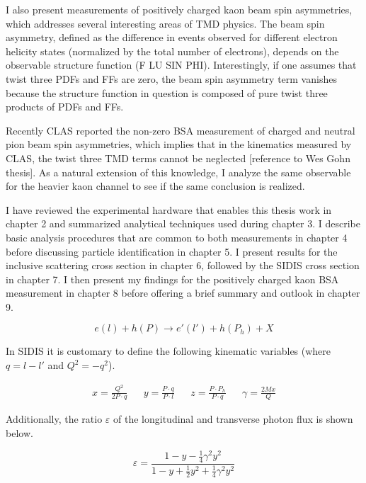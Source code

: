 I also present measurements of positively charged kaon beam spin asymmetries, which addresses several interesting areas of TMD physics.  The beam spin asymmetry, defined as the difference in events observed for different electron helicity states (normalized by the total number of electrons), depends on the observable structure function (F LU SIN PHI).  Interestingly, if one assumes that twist three PDFs and FFs are zero, the beam spin asymmetry term vanishes because the structure function in question is composed of pure twist three products of PDFs and FFs.

Recently CLAS reported the non-zero BSA measurement of charged and neutral pion beam spin asymmetries, which implies that in the kinematics measured by CLAS, the twist three TMD terms cannot be neglected [reference to Wes Gohn thesis].  As a natural extension of this knowledge, I analyze the same observable for the heavier kaon channel to see if the same conclusion is realized.

I have reviewed the experimental hardware that enables this thesis work in chapter 2 and summarized analytical techniques used during chapter 3.  I describe basic analysis procedures that are common to both measurements in chapter 4 before discussing particle identification in chapter 5.  I present results for the inclusive scattering cross section in chapter 6, followed by the SIDIS cross section in chapter 7.  I then present my findings for the positively charged kaon BSA measurement in chapter 8 before offering a brief summary and outlook in chapter 9. 

%
%
%

\begin{equation}
  e(l) + h(P) \rightarrow e'(l') + h(P_{h}) + X 
\end{equation}

In SIDIS it is customary to define the following kinematic variables (where $q = l - l'$ and $Q^{2} = -q^{2}$). 

\begin{align}
  x = \frac{Q^{2}}{2P \cdot q} && y = \frac{P \cdot q}{P \cdot l} && z = \frac{P \cdot P_{h}}{P \cdot q} && \gamma = \frac{2Mx}{Q}
\end{align}

Additionally, the ratio $\varepsilon$ of the longitudinal and transverse photon flux is shown below.

\begin{equation}
	\varepsilon = \frac{1 - y - \frac{1}{4}\gamma^2 y^2}{1 - y + \frac{1}{2}y^2 + \frac{1}{4}\gamma^2 y^2}
\end{equation}

